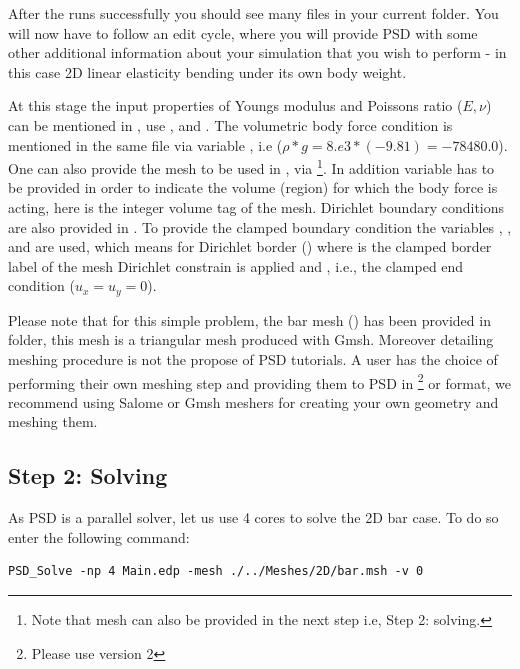 After the  runs successfully you should see many
 files in your current folder. You will now have to follow an
edit cycle, where you will provide PSD with some other additional
information about your simulation that you wish to perform - in this
case 2D linear elasticity bending under its own body weight.

At this stage the input properties of Youngs modulus and Poissons ratio
(\(E,\nu\)) can be mentioned in , use
, and . The volumetric body force
condition is mentioned in the same file via variable
, i.e (\(\rho*g=8.e3*(-9.81)=-78480.0\)). One can
also provide the mesh to be used in , via
\footnote{Note that mesh can also be provided in the next step i.e, Step 2: solving.}.
In addition variable  has to be provided in order to
indicate the volume (region) for which the body force is acting, here
 is the integer volume tag of the mesh. Dirichlet boundary
conditions are also provided in . To provide
the clamped boundary condition the variables ,
, and  are used, which means for Dirichlet
border  () where  is the clamped border
label of the mesh Dirichlet constrain is applied and ,
 i.e., the clamped end condition (\(u_x=u_y=0\)).

Please note that for this simple problem, the bar mesh ()
has been provided in  folder, this mesh is a
triangular mesh produced with Gmsh. Moreover detailing meshing procedure
is not the propose of PSD tutorials. A user has the choice of performing
their own meshing step and providing them to PSD in
\footnote{Please use version 2} or  format, we
recommend using Salome or Gmsh meshers for creating your own geometry
and meshing them.

\subsection{Step 2: Solving}

As PSD is a parallel solver, let us use 4 cores to solve the 2D bar
case. To do so enter the following command:

\begin{lstlisting}[style=BashInputStyle]
PSD_Solve -np 4 Main.edp -mesh ./../Meshes/2D/bar.msh -v 0
\end{lstlisting}

